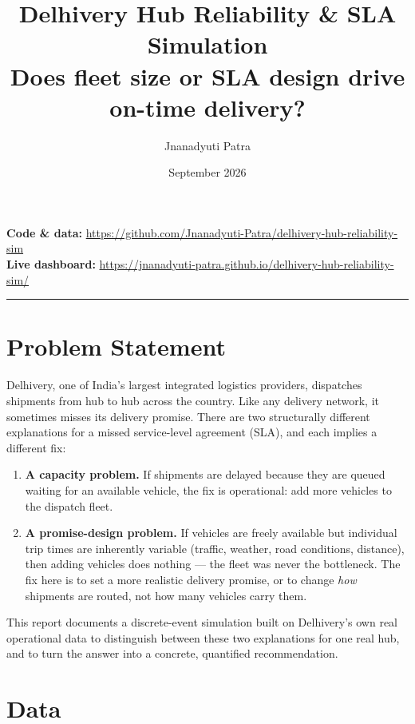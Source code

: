 \documentclass[10.5pt,a4paper]{article}
\title{\vspace{-2em}\textbf{\Large Delhivery Hub Reliability \& SLA Simulation}\\[0.3em]
\large\color{muted} Does fleet size or SLA design drive on-time delivery?}
\author{Jnanadyuti Patra}
\date{September 2026}
\begin{document}
\maketitle
\vspace{-2em}

\noindent
\textbf{Code \& data:} \url{https://github.com/Jnanadyuti-Patra/delhivery-hub-reliability-sim}\\
\textbf{Live dashboard:} \url{https://jnanadyuti-patra.github.io/delhivery-hub-reliability-sim/}

\vspace{1em}
\hrule
\vspace{1em}

\section{Problem Statement}

Delhivery, one of India's largest integrated logistics providers, dispatches shipments from hub to hub across the country. Like any delivery network, it sometimes misses its delivery promise. There are two structurally different explanations for a missed service-level agreement (SLA), and each implies a different fix:

\begin{enumerate}[leftmargin=1.4em]
  \item \textbf{A capacity problem.} If shipments are delayed because they are queued waiting for an available vehicle, the fix is operational: add more vehicles to the dispatch fleet.
  \item \textbf{A promise-design problem.} If vehicles are freely available but individual trip times are inherently variable (traffic, weather, road conditions, distance), then adding vehicles does nothing --- the fleet was never the bottleneck. The fix here is to set a more realistic delivery promise, or to change \emph{how} shipments are routed, not how many vehicles carry them.

\end{enumerate}

This report documents a discrete-event simulation built on Delhivery's own real operational data to distinguish between these two explanations for one real hub, and to turn the answer into a concrete, quantified recommendation.

\section{Data}
\end{document}
